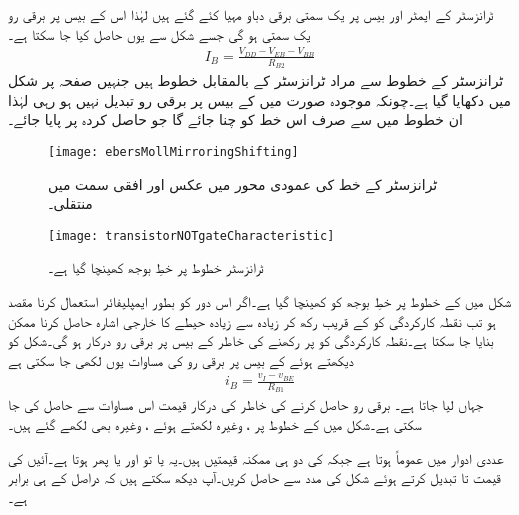 ٹرانزسٹر  کے ایمٹر اور بیس پر یک سمتی برقی دباو مہیا کئے گئے ہیں لہٰذا  اس کے بیس پر برقی رو  یک سمتی ہو گی جسے شکل سے یوں حاصل کیا جا سکتا ہے۔
\begin{align*}
I_{B}=\frac{V_{DD}-V_{EB}-V_{BB}}{R_{B2}}
\end{align*}
ٹرانزسٹر  کے  خطوط سے مراد  ٹرانزسٹر  کے  بالمقابل  خطوط ہیں جنہیں صفحہ  پر شکل  میں دکھایا گیا ہے۔چونکہ موجودہ  صورت میں  کے بیس پر برقی رو تبدیل نہیں ہو رہی لہٰذا ان خطوط میں سے صرف اس خط کو چنا جائے گا جو حاصل کردہ   پر پایا جائے۔
\begin{figure}
\centering
\texttt{[image: ebersMollMirroringShifting]}
\caption{ٹرانزسٹر کے خط کی عمودی محور میں عکس اور افقی سمت میں منتقلی۔}
\label{شکل_ٹرانزسٹر_خط_عمودی_عکس_افقی_منتقلی}
\end{figure}
%
\begin{figure}
\centering
\texttt{[image: transistorNOTgateCharacteristic]}
\caption{ٹرانزسٹر خطوط پر خطِ بوجھ کھینچا گیا ہے۔}
\label{شکل_ٹرانزسٹر_خطوط_پر_بار_کا_خط}
\end{figure}

شکل  میں  کے خطوط پر خطِ بوجھ  کو کھینچا گیا ہے۔اگر اس دور کو بطور ایمپلیفائر استعمال کرنا مقصد ہو تب نقطہ کارکردگی کو  کے قریب رکھ کر زیادہ سے زیادہ حیطے کا خارجی اشارہ حاصل کرنا ممکن بنایا جا سکتا ہے۔نقطہ کارکردگی کو  پر رکھنے کی خاطر  کے بیس پر  برقی رو درکار ہو گی۔شکل  کو دیکھتے ہوئے  کے بیس پر برقی رو کی مساوات یوں لکھی جا سکتی ہے
\begin{align*}
i_B=\frac{v_I-v_{BE}}{R_{B1}}
\end{align*}
جہاں  لیا جاتا ہے۔ برقی رو حاصل کرنے کی خاطر  کی درکار قیمت  اس مساوات سے حاصل کی جا سکتی ہے۔شکل  میں  کے خطوط  پر ،  وغیرہ لکھتے ہوئے ،  وغیرہ بھی  لکھے گئے ہیں۔

عددی ادوار میں عموماً  ہوتا ہے جبکہ  کی دو ہی ممکنہ قیمتیں ہیں۔یہ یا تو  اور  یا پھر  ہوتا ہے۔آئیں  کی قیمت  تا  تبدیل کرتے ہوئے شکل  کی مدد سے   حاصل کریں۔آپ دیکھ سکتے ہیں کہ  دراصل  کے ہی برابر ہے۔

